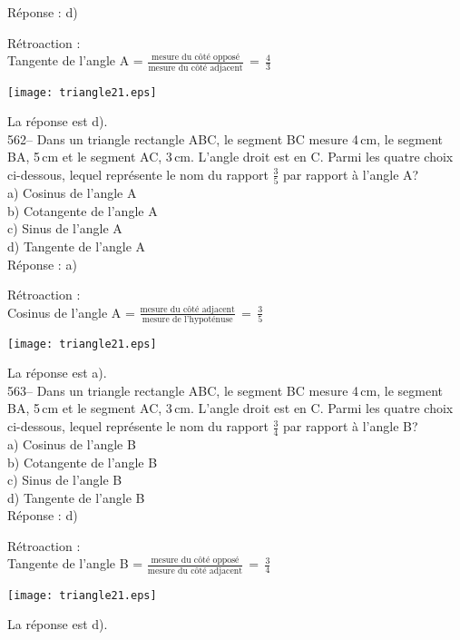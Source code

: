 ﻿\documentclass[letterpaper, 12pt]{article}
\begin{document}
R\'eponse : d)

R\'etroaction : \\
Tangente de l'angle A = $\frac{\textrm{mesure du c\^ot\'e
oppos\'e}}{\textrm{mesure du c\^ot\'e
adjacent}}\,=\,\frac{\textrm{4}}{\textrm{3}}$\\
    \begin{center}
    \texttt{[image: triangle21.eps]}
    \end{center}

La r\'eponse est d).\\


562-- Dans un triangle rectangle ABC, le segment BC mesure 4\,cm, le segment
BA, 5\,cm et le segment AC, 3\,cm.  L'angle droit est en C.  Parmi les
quatre choix ci-dessous, lequel repr\'esente le nom du rapport $\frac{3}{5}$
par rapport \`a l'angle A?\\
a) Cosinus de l'angle A\\
b) Cotangente de l'angle A\\
c) Sinus de l'angle A\\
d) Tangente de l'angle A\\

R\'eponse : a)

R\'etroaction : \\
Cosinus de l'angle A = $\frac{\textrm{mesure du c\^ot\'e
adjacent}}{\textrm{mesure de
l'hypot\'enuse}}\,=\,\frac{\textrm{3}}{\textrm{5}}$\\
\begin{center}
    \texttt{[image: triangle21.eps]}
    \end{center}
La r\'eponse est a).\\

563-- Dans un triangle rectangle ABC, le segment BC mesure 4\,cm, le segment
BA, 5\,cm et le segment AC, 3\,cm.  L'angle droit est en C.  Parmi les
quatre choix ci-dessous, lequel repr\'esente le nom du rapport $\frac{3}{4}$
par rapport \`a l'angle B?\\
a) Cosinus de l'angle B\\
b) Cotangente de l'angle B\\
c) Sinus de l'angle B\\
d) Tangente de l'angle B\\

R\'eponse : d)

R\'etroaction : \\
Tangente de l'angle B = $\frac{\textrm{mesure du c\^ot\'e
oppos\'e}}{\textrm{mesure du c\^ot\'e
adjacent}}\,=\,\frac{\textrm{3}}{\textrm{4}}$\\
\begin{center}
    \texttt{[image: triangle21.eps]}
    \end{center}
La r\'eponse est d).\\
\end{document}
